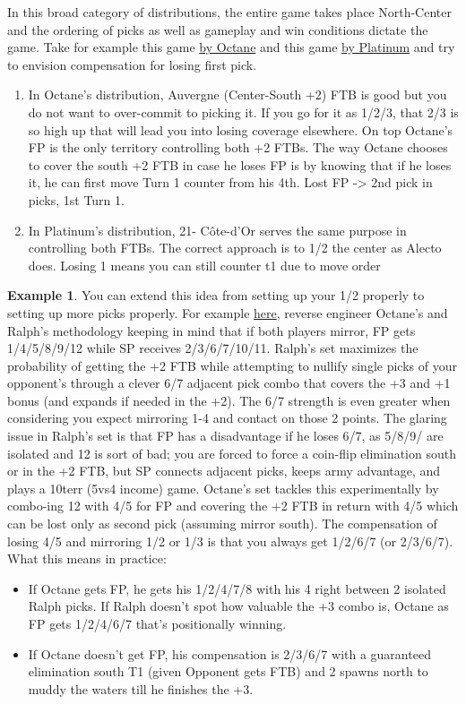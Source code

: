 In this broad category of distributions, the entire game takes place North-Center and the ordering of picks as well as gameplay and win conditions dictate the game. Take for example this game \href{https://www.warzone.com/MultiPlayer?GameID=36761893}{by Octane} and this game \href{https://www.warzone.com/MultiPlayer?GameID=35996112}{by Platinum} and try to envision compensation for losing first pick.
\begin{enumerate}
    \item In Octane's distribution, Auvergne (Center-South +2) FTB is good but you do not want to over-commit to picking it. If you go for it as 1/2/3, that 2/3 is so high up that will lead you into losing coverage elsewhere. On top Octane's FP is the only territory controlling both +2 FTBs. The way Octane chooses to cover the south +2 FTB in case he loses FP is by knowing that if he loses it, he can first move Turn 1 counter from his 4th. Lost FP -> 2nd pick in picks, 1st Turn 1. 
    \item In Platinum's distribution, 21- Côte-d'Or serves the same purpose in controlling both FTBs. The correct approach is to 1/2 the center as Alecto does. Losing 1 means you can still counter t1 due to move order
\end{enumerate}

\textbf{Example 1}.
You can extend this idea from setting up your 1/2 properly to setting up more picks properly. For example \href{https://www.warzone.com/MultiPlayer?GameID=37941014}{here}, reverse engineer Octane's and Ralph's methodology keeping in mind that if both players mirror, FP gets 1/4/5/8/9/12 while SP receives 2/3/6/7/10/11. Ralph's set maximizes the probability of getting the +2 FTB while attempting to nullify single picks of your opponent's through a clever 6/7 adjacent pick combo that covers the +3 and +1 bonus (and expands if needed in the +2). The 6/7 strength is even greater when considering you expect mirroring 1-4 and contact on those 2 points. The glaring issue in Ralph's set is that FP has a disadvantage if he loses 6/7, as 5/8/9/ are isolated and 12 is sort of bad; you are forced to force a coin-flip elimination south or in the +2 FTB, but SP connects adjacent picks, keeps army advantage, and plays a 10terr (5vs4 income) game. Octane's set tackles this experimentally by combo-ing 12 with 4/5 for FP and covering the +2 FTB in return with 4/5 which can be lost only as second pick (assuming mirror south). The compensation of losing 4/5 and mirroring 1/2 or 1/3 is that you always get 1/2/6/7 (or 2/3/6/7). What this means in practice:
\begin{itemize}
    \item If Octane gets FP, he gets his 1/2/4/7/8 with his 4 right between 2 isolated Ralph picks. If Ralph doesn't spot how valuable the +3 combo is, Octane as FP gets 1/2/4/6/7 that's positionally winning.
    \item If Octane doesn't get FP, his compensation is 2/3/6/7 with a guaranteed elimination south T1 (given Opponent gets FTB) and 2 spawns north to muddy the waters till he finishes the +3.
\end{itemize}

